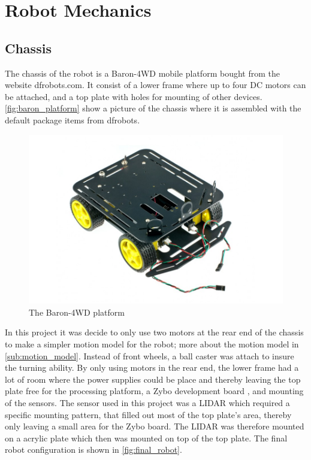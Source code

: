 \documentclass[Main]{subfiles}
\begin{document}
\section{Robot Mechanics} %
	\label{sec:robot_mechanics}

	\subsection{Chassis} %
		\label{sub:chassis}
		The chassis of the robot is a Baron-4WD mobile platform bought from the website dfrobots.com. It consist of a lower frame where up to four DC motors can be attached, and a top plate with holes for mounting of other devices. \autoref{fig:baron_platform} show a picture of the chassis where it is assembled with the default package items from dfrobots.
\begin{figure}[H]
	\centering
	\includegraphics[scale=0.5]{./Figures/baron_platform.jpg}
	\caption{The Baron-4WD platform}
	\label{fig:baron_platform}
\end{figure}\noindent
In this project it was decide to only use two motors at the rear end of the chassis to make a simpler motion model for the robot; more about the motion model in \autoref{sub:motion_model}. Instead of front wheels, a ball caster was attach to insure the turning ability. By only using motors in the rear end, the lower frame had a lot of room where the power supplies could be place and thereby leaving the top plate free for the processing platform, a Zybo development board , and mounting of the sensors. The sensor used in this project was a LIDAR  which required a specific mounting pattern, that filled out most of the top plate's area, thereby only leaving a small area for the Zybo board. The LIDAR was therefore mounted on a acrylic plate which then was mounted on top of the top plate. The final robot configuration is shown in \autoref{fig:final_robot}.
\end{document}
